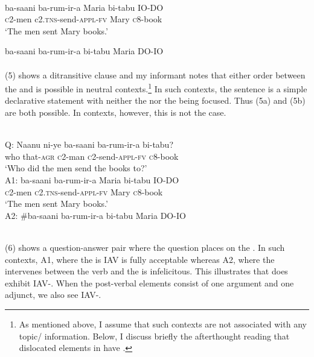 \documentclass[output=paper,newtxmath,modfonts,nonflat,draft]{langsci/langscibook}
\begin{document}
\ea\label{ex:selvanathan:5}
\\
\ea\label{ex:selvanathan:5a}
\gll ba-saani   ba-rum-ir-a        Maria   bi-tabu   IO-DO \\
	\textsc{c}2-men   c2.\textsc{tns}{}-send-\textsc{appl}{}-\textsc{fv}   Mary   \textsc{c}8-book \\
\glt `The men sent Mary books.'

\ex\label{ex:selvanathan:5b}
	\gll ba-saani   ba-rum-ir-a    bi-tabu   Maria     DO-IO \\
	\\
\z
\z
(5) shows a ditransitive clause and my informant notes that either order between the  and  is possible in neutral contexts.\footnote{As mentioned above, I assume that such contexts are not associated with any topic\slash {} information. Below, I discuss briefly the afterthought reading that dislocated elements in  have \citep{Diercks2013}.}  In such contexts, the sentence is a simple declarative statement with neither the  nor the  being focused. Thus (5a) and (5b) are both possible. In  contexts, however, this is not the case.

\ea\label{ex:selvanathan:6}
 \\
Q: \gll Naanu      ni-ye            ba-saani    ba-rum-ir-a     bi-tabu?\\
who       that-\textsc{agr}   \textsc{c}2-man      \textsc{c}2-send-\textsc{appl}{}-\textsc{fv}  \textsc{c}8-book\\
\glt \-\hspace{0.5cm}`Who did the men send the books to?' \\

A1: \gll ba-saani    ba-rum-ir-a            Maria  bi-tabu       IO-DO \\
	\textsc{c}2-men     \textsc{c}2.\textsc{tns}{}-send-\textsc{appl}{}-\textsc{fv}   Mary   \textsc{c}8-book \\

\glt \-\hspace{0.5cm}`The men sent Mary books.'\\

A2: \gll \#ba-saani  ba-rum-ir-a            bi-tabu   Maria         DO-IO \\
\\
\z

(6) shows a question-answer pair where the question places  on the . In such contexts, A1, where the  is IAV is fully acceptable whereas A2, where the  intervenes between the verb and the  is infelicitous. This illustrates that  does exhibit IAV-. When the post-verbal elements consist of one argument and one adjunct, we also see IAV-.
\end{document}
